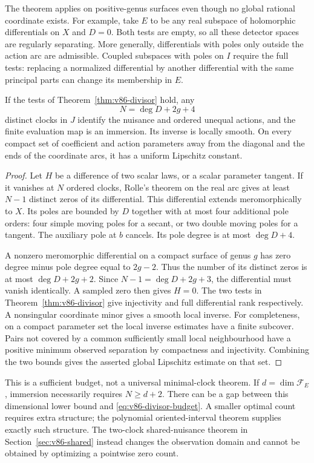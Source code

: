 The theorem applies on positive-genus surfaces even though no global
rational coordinate exists. For example, take $E$ to be any real
subspace of holomorphic differentials on $X$ and $D=0$. Both tests
are empty, so all these detector spaces are regularly separating.
More generally, differentials with poles only outside the action arc
are admissible. Coupled subspaces with poles on $I$ require the full
tests: replacing a normalized differential by another differential
with the same principal parts can change its membership in $E$.

\begin{theorem}\label{thm:v86-divisor-budget}
If the tests of Theorem~\ref{thm:v86-divisor} hold, any
\begin{equation}\label{eq:v86-divisor-budget}
                            N=\deg D+2g+4
\end{equation}
distinct clocks in $J$ identify the nuisance and ordered unequal
actions, and the finite evaluation map is an immersion. Its inverse
is locally smooth. On every compact set of coefficient and action
parameters away from the diagonal and the ends of the coordinate
arcs, it has a uniform Lipschitz constant.
\end{theorem}
\begin{proof}
Let $H$ be a difference of two scalar laws, or a scalar parameter
tangent. If it vanishes at $N$ ordered clocks, Rolle's theorem on the
real arc gives at least $N-1$ distinct zeros of its differential.
This differential extends meromorphically to $X$. Its poles are bounded
by $D$ together with at most four additional pole orders: four simple
moving poles for a secant, or two double moving poles for a tangent.
The auxiliary pole at $b$ cancels. Its pole degree is at most
$\deg D+4$.

A nonzero meromorphic differential on a compact surface of genus $g$
has zero degree minus pole degree equal to $2g-2$. Thus the number of
its distinct zeros is at most $\deg D+2g+2$. Since
$N-1=\deg D+2g+3$, the differential must vanish identically.
A sampled zero then gives $H=0$. The two tests in
Theorem~\ref{thm:v86-divisor} give injectivity and full differential
rank respectively. A nonsingular coordinate minor gives a smooth
local inverse. For completeness, on a compact parameter set the local
inverse estimates have a finite subcover. Pairs not covered by a
common sufficiently small local neighbourhood have a positive minimum
observed separation by compactness and injectivity. Combining the two
bounds gives the asserted global Lipschitz estimate on that set.
\end{proof}
This is a sufficient budget, not a universal minimal-clock theorem.
If $d=\dim\mathcal F_E$, immersion necessarily requires $N\ge d+2$.
There can be a gap between this dimensional lower bound and
\eqref{eq:v86-divisor-budget}. A smaller optimal count requires extra
structure; the polynomial oriented-interval theorem supplies exactly
such structure. The two-clock shared-nuisance theorem in
Section~\ref{sec:v86-shared} instead changes the observation domain
and cannot be obtained by optimizing a pointwise zero count.

